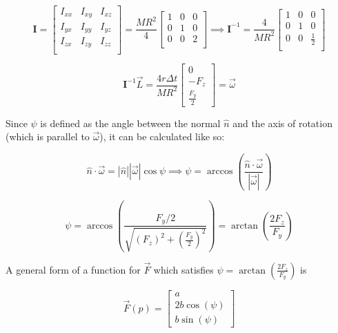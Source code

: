 \documentclass[english,12pt,a4paper,final]{article}
\begin{document}
\begin{equation*}
	\mathbf{I}
	=
	\begin{bmatrix}
		I_{xx} & I_{xy} & I_{xz} \\
		I_{yx} & I_{yy} & I_{yz} \\
		I_{zx} & I_{zy} & I_{zz} \\
	\end{bmatrix}
	=
	\frac{MR^2}{4}
	\begin{bmatrix}
		1 & 0 & 0 \\
		0 & 1 & 0 \\
		0 & 0 & 2 \\
	\end{bmatrix}
	\implies
	\mathbf{I}^{-1}
	=
	\frac{4}{MR^2}
	\begin{bmatrix}
		1 & 0 & 0 \\
		0 & 1 & 0 \\
		0 & 0 & \frac{1}{2} \\
	\end{bmatrix}
\end{equation*}

\begin{equation*}
	\mathbf{I}^{-1} \vec{L} = \frac{4r\Delta t}{MR^2} \begin{bmatrix}0\\- F_z \\ \frac{F_y}{2} \end{bmatrix} = \vec{\omega}
\end{equation*}

Since $\psi$ is defined as the angle between the normal $\hat{n}$ and the axis of rotation (which is parallel to $\vec{\omega}$), it can be calculated like so:

\begin{equation*}
	\hat{n} \cdot \vec{\omega} = |\hat{n}| |\vec{\omega}| \cos\psi \implies \psi = \arccos\left(\frac{\hat{n}\cdot\vec{\omega}}{|\vec{\omega}|}\right)
\end{equation*}

\begin{equation*}
	\psi = \arccos \left(\frac{F_y/2}{\sqrt{(F_z)^2+(\frac{F_y}{2})^2}}\right) = \arctan\left(\frac{2F_z}{F_y}\right)
\end{equation*}

A general form of a function for $\vec{F}$ which satisfies $\psi = \arctan\left(\frac{2F_z}{F_y}\right)$ is

\begin{equation*}
	\vec{F}(p) = \begin{bmatrix}a\\2b\cos\left(\psi\right)\\b\sin\left(\psi\right)\end{bmatrix}
\end{equation*}
\end{document}
